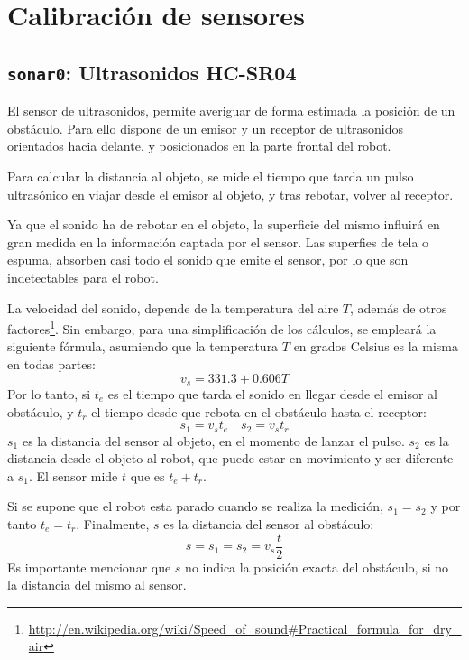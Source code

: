 \documentclass[10pt,a4paper,hidelinks,twocolumn]{article}
\begin{document}
\section{Calibración de sensores}
\subsection{\texttt{sonar0}: Ultrasonidos HC-SR04}

El sensor de ultrasonidos, permite averiguar de forma estimada la posición de un 
obstáculo. Para ello dispone de un emisor y un receptor de ultrasonidos 
orientados hacia delante, y posicionados en la parte frontal del robot.

Para calcular la distancia al objeto, se mide el tiempo que tarda un pulso 
ultrasónico en viajar desde el emisor al objeto, y tras rebotar, volver al 
receptor.

Ya que el sonido ha de rebotar en el objeto, la superficie del mismo influirá en 
gran medida en la información captada por el sensor. Las superfies de tela o 
espuma, absorben casi todo el sonido que emite el sensor, por lo que son 
indetectables para el robot.

La velocidad del sonido, depende de la temperatura del aire $T$, además de otros
factores\footnote{\url{http://en.wikipedia.org/wiki/Speed\_of\_sound\#Practical\_formula\_for\_dry\_air}}.
Sin embargo, para una simplificación de los cálculos, se empleará la siguiente
fórmula, asumiendo que la temperatura $T$ en grados Celsius es la misma en todas 
partes:
\begin{equation}
	v_{s} = 331.3 + 0.606T \label{eq:velocidad-sonido}
\end{equation}
Por lo tanto, si $t_e$ es el tiempo que tarda el sonido en llegar desde el 
emisor al obstáculo, y $t_r$ el tiempo desde que rebota en el obstáculo hasta el 
receptor:
$$ s_1 = v_{s} t_e \quad s_2 = v_{s} t_r $$
$s_1$ es la distancia del sensor al objeto, en el momento de lanzar el pulso.  
$s_2$ es la distancia desde el objeto al robot, que puede estar en movimiento y 
ser diferente a $s_1$. El sensor mide $t$ que es $t_e+t_r$.

Si se supone que el robot esta parado cuando se realiza la medición, $s_1 = s_2$ 
y por tanto $t_e = t_r$. Finalmente, $s$ es la distancia del sensor al 
obstáculo:
\begin{equation}
	s = s_1 = s_2 = v_{s}\frac{t}{2}\label{eq:velocidad-tiempo}
\end{equation}
Es importante mencionar que $s$ no indica la posición exacta del obstáculo, si 
no la distancia del mismo al sensor.
\end{document}
